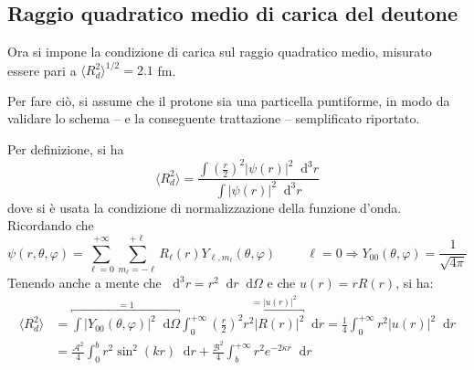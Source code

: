 \documentclass[11pt, a4paper]{scrartcl}
\theoremstyle{style}
\newcommand{\dd}{\mathop{}\!\mathrm{d}}
\numberwithin{equation}{subsection}
\begin{document}
\subsection{Raggio quadratico medio di carica del deutone}
Ora si impone la condizione di carica sul raggio quadratico medio, misurato essere pari a $\langle R_d^2 \rangle^{1/2} = 2.1$ fm.
\begin{center}
	\begin{minipage}
		{.45\columnwidth}
	Per fare ci\`o, si assume che il protone sia una particella puntiforme, in modo da validare lo schema -- e la conseguente trattazione -- semplificato riportato.
	\end{minipage}
	\hfill
	\begin{minipage}
		{.45\columnwidth}
	\centering
	\end{minipage}
\end{center}
Per definizione, si ha 
\[
\langle R_d^2 \rangle = \frac{\displaystyle \int \left(\frac{r}{2}\right) ^2 \lvert \psi (r) \rvert ^2 \dd^3r }{\displaystyle \int \lvert \psi (r) \rvert ^2 \dd^3r}
\] 
dove si \`e usata la condizione di normalizzazione della funzione d'onda. 
Ricordando che 
\[
	\psi (r,\theta ,\varphi ) = \sum_{\ell =0}^{+\infty} \sum_{m_\ell = -\ell  }^{+\ell } R_\ell (r) Y_{\ell ,m_\ell }(\theta, \varphi ) \hspace{1cm} \ell =0 \Rightarrow Y_{0 0 }(\theta ,\varphi ) = \frac{1}{\sqrt{4\pi} }
\] 
Tenendo anche a mente che $\dd^3 r= r^2 \dd r \dd \Omega $ e che $u(r) = rR(r)$, si ha:
\[
\begin{split}
	\langle R^2_d \rangle &= \overbracket{\int \lvert Y_{00}(\theta ,\varphi ) \rvert ^2\dd \Omega}^{=1}  \int_0^{+\infty} \left(\frac{r}{2}\right) ^2 \overbracket{r^2\lvert R(r) \rvert ^2}^{=\lvert u(r) \rvert ^2}  \dd r = \frac{1}{4}\int _0^{+\infty} r^2 \lvert u(r) \rvert ^2 \dd r\\
			      &= \frac{\mathcal{A} ^2}{4} \int _0^b r^2 \sin ^2 (kr) \dd r+ \frac{\mathcal{B}^2 }{4} \int _b^{+\infty} r^2 e^{-2\kappa r} \dd r
\end{split}
\] 
\end{document}
